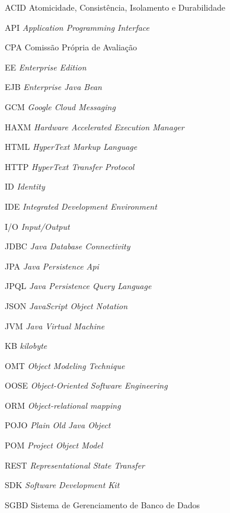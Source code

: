 
\begin{SingleSpace}

	\begin{siglas}
		
		\item[ACID] Atomicidade, Consistência, Isolamento e Durabilidade
		\item[API] \textit{Application Programming Interface}
		\item[CPA] Comissão Própria de Avaliação
		\item[EE]	\textit{Enterprise Edition}
		\item[EJB]	\textit{Enterprise Java Bean}
		\item[GCM] \textit{Google Cloud Messaging}
		\item[HAXM] \textit{Hardware Accelerated Execution Manager}
		\item[HTML] \textit{HyperText Markup Language}
		\item[HTTP] \textit{HyperText Transfer Protocol}
		\item[ID] \textit{Identity}
		\item[IDE] \textit{Integrated Development Environment}
		\item[I/O] \textit{Input/Output}
		\item[JDBC] \textit{Java Database Connectivity}
		\item[JPA] \textit{Java Persistence Api}
		\item[JPQL] \textit{Java Persistence Query Language}
		\item[JSON] \textit{JavaScript Object Notation}
		\item[JVM] \textit{Java Virtual Machine} 
		\item[KB]	\textit{kilobyte}
		\item[OMT] \textit{Object Modeling Technique}
		\item[OOSE] \textit{Object-Oriented Software Engineering}
		\item[ORM] \textit{Object-relational mapping}
		\item[POJO] \textit{Plain Old Java Object}
		\item[POM] \textit{Project Object Model}
		\item[REST] \textit{Representational State Transfer}
		\item[SDK] \textit{Software Development Kit}
		\item[SGBD] Sistema de Gerenciamento de Banco de Dados

\end{siglas}
\end{SingleSpace}
